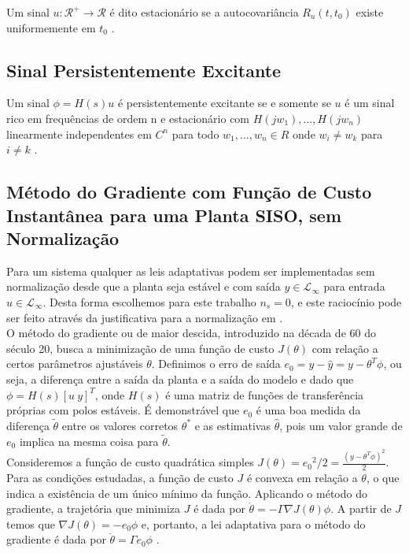\documentclass[
	12pt,				%
	openright,			%
	twoside,			%
	a4paper,			%
	english,			%
	french,				%
	spanish,			%
	brazil				%
	]{abntex2}
\begin{document}
 Um sinal $u:\mathcal{R}^+\rightarrow \mathcal{R}$ é dito estacionário se a autocovariância $R_u(t,t_0)$ existe uniformemente em $t_0$ \cite[p.~256]{ioannou2}.

\subsection{Sinal Persistentemente Excitante}

 Um sinal $\phi = H(s)u $ é persistentemente excitante se e somente se $u$ é um sinal rico em frequências de ordem n e estacionário com $H(jw_1),...,H(jw_n)$ linearmente independentes em $C^n$ para todo $w_1,...,w_n \in R$ onde $w_i\neq w_k$ para $i\neq k$ \cite[p.~256-257]{ioannou2}. \\

\subsection{Método do Gradiente com Função de Custo Instantânea para uma Planta SISO, sem Normalização}
  
  
  Para um sistema qualquer as leis adaptativas podem ser implementadas sem normalização desde
  que a planta seja estável e com saída $y\in \mathcal{L}_\infty$ para entrada $u\in \mathcal{L}_\infty$. Desta forma escolhemos para este trabalho $n_s=0$, e este raciocínio pode ser feito através da justificativa para a normalização em \cite[p.~162]{ioannou2}.\\
  
 O método do gradiente ou de maior descida, introduzido na década de 60 do século 20, busca a minimização de uma função de custo $J(\theta)$ com relação a certos parâmetros ajustáveis $\theta$. Definimos o erro de saída $e_0 = y - \hat{y} = y-\theta^T\phi$, ou seja, a diferença entre a saída da planta e a saída do modelo e dado que $\phi = H(s)[u~y]^T$, onde $H(s)$ é uma matriz de funções de transferência próprias com polos estáveis. É demonstrável que $e_0$ é uma boa medida da diferença $\tilde{\theta}$ entre os valores corretos $\theta^*$ e as estimativas $\hat{\theta}$, pois um valor grande de $e_0$ implica na mesma coisa para $\tilde{\theta}$.\\
 
 Consideremos a função de custo quadrática simples $J(\theta) = {e_0}^2/2 = \frac{(y - \theta^T \phi)^2}{2}$. Para as condições estudadas, a função de custo $J$ é convexa em relação a $\theta$, o que indica a existência de um único mínimo da função. Aplicando o método do gradiente, a trajetória que minimiza $J$ é dada por $\dot{\theta} = -\Gamma \nabla J(\theta) \phi$. A partir de $J$ temos que $ \nabla J(\theta) = -e_0 \phi$ e, portanto, a lei adaptativa para o método do gradiente é dada por $\dot{\theta} = \Gamma e_0 \phi$ \cite[p.~180-186]{ioannou2}.
\end{document}
